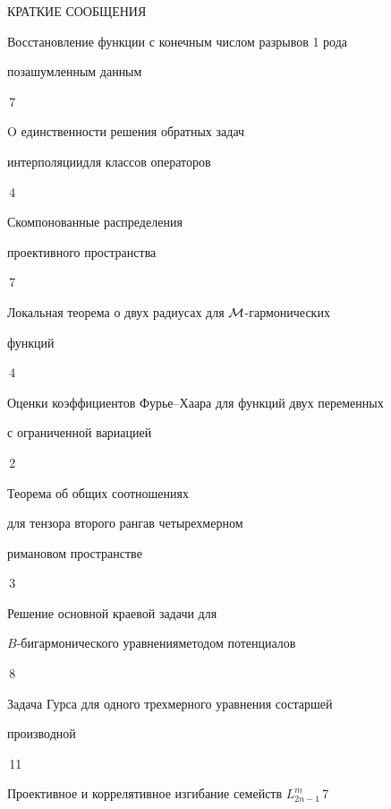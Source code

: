 \bigskip


{\centerline {КРАТКИЕ СООБЩЕНИЯ}}


\bigskip










{Восстановление функции с конечным числом разрывов 1 рода


по\newline зашумленным данным}{\No\,7}




{O единственности решения обратных задач


интерполяции\newline для классов операторов}{\No\,4}




{Скомпонованные распределения


проективного пространства}{\No\,7}




{Локальная теорема о двух радиусах для $\cal M$-гармонических 


функций}{\No\,4}




{Оценки коэффициентов Фурье--Хаара для функций двух переменных\newline


с ограниченной вариацией}{\No\,2}




{Теорема об общих соотношениях


для тензора второго ранга\newline в четырехмерном


римановом пространстве}{\No\,3}




{Решение основной краевой задачи для 


$B$-бигармонического уравнения\newline методом потенциалов}{\No\,8}




{Задача Гурса для одного трехмерного уравнения со\newline старшей 


производной}{\No\,11}




{Проективное и коррелятивное изгибание семейств $L^m_{2n-1}$}{\No\,7}


